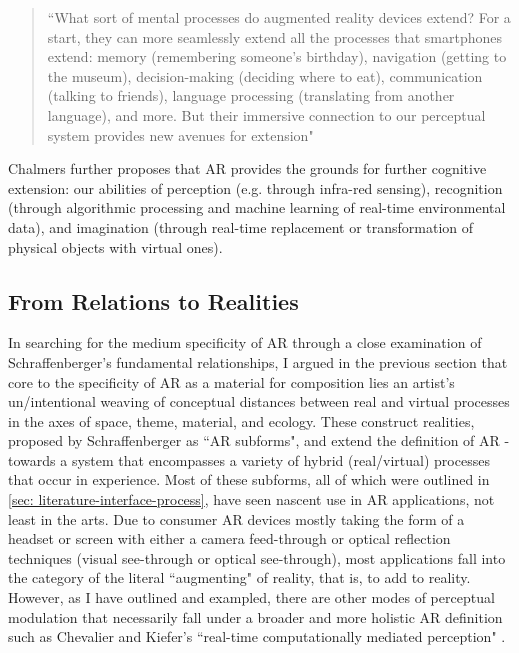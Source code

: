 \begin{quote}
    ``What sort of mental processes do augmented reality devices extend? For a start, they can more seamlessly extend all the processes that smartphones extend: memory (remembering someone's birthday), navigation (getting to the museum), decision-making (deciding where to eat), communication (talking to friends), language processing (translating from another language), and more. But their immersive connection to our perceptual system provides new avenues for extension" \citep[p. 299]{chalmers2022}
\end{quote}
Chalmers further proposes that AR provides the grounds for further cognitive extension: our abilities of perception (e.g. through infra-red sensing), recognition (through algorithmic processing and machine learning of real-time environmental data), and imagination (through real-time replacement or transformation of physical objects with virtual ones).

\subsection{From Relations to Realities}\label{sec: theory-embodiment-realities}
In searching for the medium specificity of AR through a close examination of Schraffenberger's fundamental relationships, I argued in the previous section that core to the specificity of AR as a material for composition lies an artist's un/intentional weaving of conceptual distances between real and virtual processes in the axes of space, theme, material, and ecology. These construct realities, proposed by Schraffenberger as ``AR subforms", and extend the definition of AR - towards a system that encompasses a variety of hybrid (real/virtual) processes that occur in experience. Most of these subforms, all of which were outlined in \autoref{sec: literature-interface-process}, have seen nascent use in AR applications, not least in the arts. Due to consumer AR devices mostly taking the form of a headset or screen with either a camera feed-through or optical reflection techniques (visual see-through or optical see-through), most applications fall into the category of the literal ``augmenting" of reality, that is, to add to reality. However, as I have outlined and exampled, there are other modes of perceptual modulation that necessarily fall under a broader and more holistic AR definition such as Chevalier and Kiefer's ``real-time computationally mediated perception" \citeyearpar[]{chevalier2020}.

